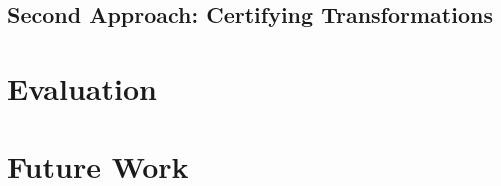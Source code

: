 \documentclass[
	msc,
	english
]{ppgccufmg}
\begin{document}
    \section{Second Approach: Certifying Transformations}
    
	\chapter{Evaluation}
	\chapter{Future Work}\label{chap:future}

		
		
\end{document}
